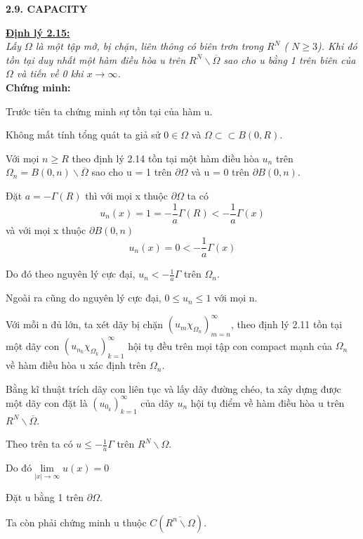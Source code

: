 \begin{center}
\textbf{2.9. CAPACITY}
\end{center}

\noindent\textbf{\underline{Định lý 2.15:}}
\\
\textit{Lấy $\Omega$ là một tập mở, bị chặn, liên thông có biên trơn trong $R^N$ ( $ N \ge 3$). Khi đó tồn tại duy nhất một hàm điều hòa u trên $R^N \backslash \overline{\Omega} $ sao cho u bằng 1 trên biên của $\Omega$ và tiến về 0 khi $ x \to \infty$.}
\\
\textbf{Chứng minh:}

Trước tiên ta chứng minh sự tồn tại của hàm u.

Không mất tính tổng quát ta giả sử $ 0 \in \Omega$ và $\Omega  \subset  \subset B(0,R)$.

Với mọi $n \geq R$ theo định lý 2.14 tồn tại một hàm điều hòa $u_n$ trên $ \Omega _ n = B(0,n) \backslash \overline{ \Omega}$ sao cho u = 1 trên $\partial \Omega$ và u = 0 trên $ \partial B(0,n)$.

Đặt $a =  - \Gamma (R)$ thì với mọi x thuộc $ \partial \Omega$ ta có
\[
u_n (x) = 1 = - \frac{1}{a}\Gamma (R) < - \frac{1}{a}\Gamma (x)
\]
và với mọi x thuộc $ \partial B(0,n)$
\[
u_n (x) = 0 <  - \frac{1}{a}\Gamma (x)
\]

Do đó theo nguyên lý cực đại, $u_n <  - \frac{1}{a}\Gamma$ trên $\Omega _ n$.

Ngoài ra cũng do nguyên lý cực đại, $ 0 \le u_n \le 1$ với mọi n.

Với mỗi n đủ lớn, ta xét dãy bị chặn $
\left( {u_m \chi _{\Omega _n } } \right)_{m = n}^\infty  
$, theo định lý 2.11 tồn tại một dãy con $
\left( {u_{n_k } \chi _{\Omega _k } } \right)_{k = 1}^\infty  
$ hội tụ đều trên mọi tập con compact mạnh của $ \Omega_n$ về hàm điều hòa u xác định trên $ \Omega_n$.

Bằng kĩ thuật trích dãy con liên tục và lấy dãy đường chéo, ta xây dựng được một dãy con đặt là $
\left( {u_{0_k } } \right)_{k = 1}^\infty  
$
của dãy $u_n$ hội tụ điểm về hàm điều hòa u trên $R^N \backslash \overline{\Omega} $.

Theo trên ta có $ u  \le  - \frac{1}{a}\Gamma$ trên $R^N \backslash \Omega$.

Do đó$
\mathop {\lim }\limits_{\left| x \right| \to \infty } u(x) = 0
$

Đặt u bằng 1 trên $\partial \Omega$.

Ta còn phải chứng minh u thuộc $
C(\overline {R^n \backslash \Omega } )
$.

